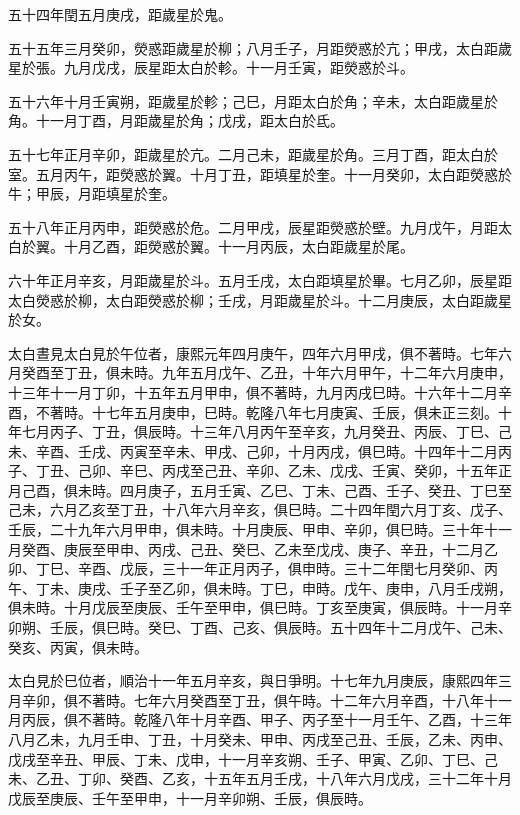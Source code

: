 \begin{pinyinscope}
五十四年閏五月庚戌，距歲星於鬼。

五十五年三月癸卯，熒惑距歲星於柳；八月壬子，月距熒惑於亢；甲戌，太白距歲星於張。九月戊戌，辰星距太白於軫。十一月壬寅，距熒惑於斗。

五十六年十月壬寅朔，距歲星於軫；己巳，月距太白於角；辛未，太白距歲星於角。十一月丁酉，月距歲星於角；戊戌，距太白於氐。

五十七年正月辛卯，距歲星於亢。二月己未，距歲星於角。三月丁酉，距太白於室。五月丙午，距熒惑於翼。十月丁丑，距填星於奎。十一月癸卯，太白距熒惑於牛；甲辰，月距填星於奎。

五十八年正月丙申，距熒惑於危。二月甲戌，辰星距熒惑於壁。九月戊午，月距太白於翼。十月乙酉，距熒惑於翼。十一月丙辰，太白距歲星於尾。

六十年正月辛亥，月距歲星於斗。五月壬戌，太白距填星於畢。七月乙卯，辰星距太白熒惑於柳，太白距熒惑於柳；壬戌，月距歲星於斗。十二月庚辰，太白距歲星於女。

太白晝見太白見於午位者，康熙元年四月庚午，四年六月甲戌，俱不著時。七年六月癸酉至丁丑，俱未時。九年五月戊午、乙丑，十年六月甲午，十二年六月庚申，十三年十一月丁卯，十五年五月甲申，俱不著時，九月丙戌巳時。十六年十二月辛酉，不著時。十七年五月庚申，巳時。乾隆八年七月庚寅、壬辰，俱未正三刻。十年七月丙子、丁丑，俱辰時。十三年八月丙午至辛亥，九月癸丑、丙辰、丁巳、己未、辛酉、壬戌、丙寅至辛未、甲戌、己卯，十月丙戌，俱巳時。十四年十二月丙子、丁丑、己卯、辛巳、丙戌至己丑、辛卯、乙未、戊戌、壬寅、癸卯，十五年正月己酉，俱未時。四月庚子，五月壬寅、乙巳、丁未、己酉、壬子、癸丑、丁巳至己未，六月乙亥至丁丑，十八年六月辛亥，俱巳時。二十四年閏六月丁亥、戊子、壬辰，二十九年六月甲申，俱未時。十月庚辰、甲申、辛卯，俱巳時。三十年十一月癸酉、庚辰至甲申、丙戌、己丑、癸巳、乙未至戊戌、庚子、辛丑，十二月乙卯、丁巳、辛酉、戊辰，三十一年正月丙子，俱申時。三十二年閏七月癸卯、丙午、丁未、庚戌、壬子至乙卯，俱未時。丁巳，申時。戊午、庚申，八月壬戌朔，俱未時。十月戊辰至庚辰、壬午至甲申，俱巳時。丁亥至庚寅，俱辰時。十一月辛卯朔、壬辰，俱巳時。癸巳、丁酉、己亥、俱辰時。五十四年十二月戊午、己未、癸亥、丙寅，俱未時。

太白見於巳位者，順治十一年五月辛亥，與日爭明。十七年九月庚辰，康熙四年三月辛卯，俱不著時。七年六月癸酉至丁丑，俱午時。十二年六月辛酉，十八年十一月丙辰，俱不著時。乾隆八年十月辛酉、甲子、丙子至十一月壬午、乙酉，十三年八月乙未，九月壬申、丁丑，十月癸未、甲申、丙戌至己丑、壬辰，乙未、丙申、戊戌至辛丑、甲辰、丁未、戊申，十一月辛亥朔、壬子、甲寅、乙卯、丁巳、己未、乙丑、丁卯、癸酉、乙亥，十五年五月壬戌，十八年六月戊戌，三十二年十月戊辰至庚辰、壬午至甲申，十一月辛卯朔、壬辰，俱辰時。


\end{pinyinscope}
